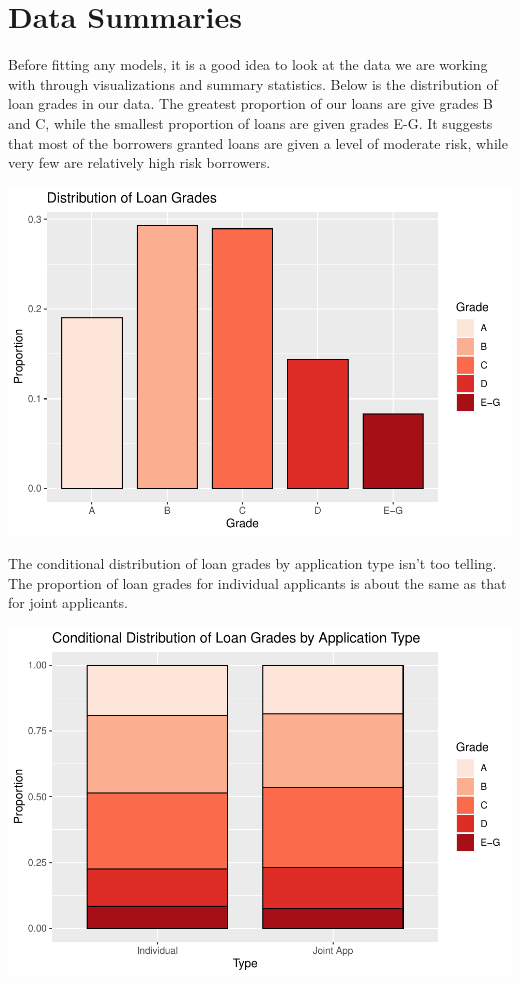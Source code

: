 \documentclass[11pt,]{article}
\begin{document}
\hypertarget{data-summaries}{%
\section{Data Summaries}\label{data-summaries}}

Before fitting any models, it is a good idea to look at the data we are
working with through visualizations and summary statistics. Below is the
distribution of loan grades in our data. The greatest proportion of our
loans are give grades B and C, while the smallest proportion of loans
are given grades E-G. It suggests that most of the borrowers granted
loans are given a level of moderate risk, while very few are relatively
high risk borrowers.

\includegraphics{An-Analysis-of-LendingClub-Loan-Grades_files/figure-latex/unnamed-chunk-1-1.pdf}

The conditional distribution of loan grades by application type isn't
too telling. The proportion of loan grades for individual applicants is
about the same as that for joint applicants.

\includegraphics{An-Analysis-of-LendingClub-Loan-Grades_files/figure-latex/unnamed-chunk-2-1.pdf}
\end{document}

